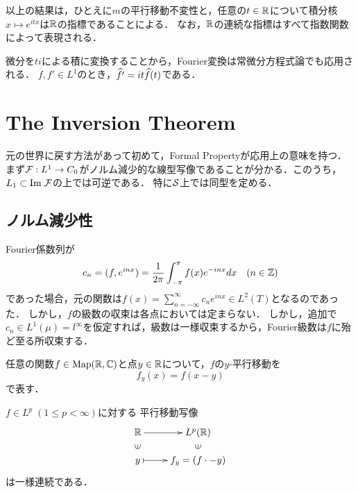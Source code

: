\documentclass[uplatex,dvipdfmx]{jsreport}
\begin{document}
\begin{remarks}
    以上の結果は，ひとえに$m$の平行移動不変性と，任意の$t\in\R$について積分核$x\mapsto e^{itx}$は$\R$の指標であることによる．
    なお，$\R$の連続な指標はすべて指数関数によって表現される．
\end{remarks}

\begin{remark}[(6)の逆]
    微分を$ti$による積に変換することから，Fourier変換は常微分方程式論でも応用される．
    $f,f'\in L^1$のとき，$\wh{f'}=it\wh{f}(t)$である．
\end{remark}

\section{The Inversion Theorem}

\begin{tcolorbox}[colframe=ForestGreen, colback=ForestGreen!10!white,breakable,colbacktitle=ForestGreen!40!white,coltitle=black,fonttitle=\bfseries\sffamily,
title=]
    元の世界に戻す方法があって初めて，Formal Propertyが応用上の意味を持つ．
    まず$\F:L^1\to C_0$がノルム減少的な線型写像であることが分かる．このうち，$L_1\subset\Im\F$の上では可逆である．
    特に$\S$上では同型を定める．
\end{tcolorbox}

\subsection{ノルム減少性}

\begin{discussion}[Fourier級数に関する逆転公式]
    Fourier係数列が
    \[c_n=(f,e^{inx})=\frac{1}{2\pi}\int^\pi_{-\pi}f(x)e^{-inx}dx\quad(n\in\Z)\]
    であった場合，元の関数は$f(x)=\sum^\infty_{n=-\infty}c_ne^{inx}\in L^2(T)$となるのであった．
    しかし，$f$の級数の収束は各点においては定まらない．
    しかし，追加で$c_n\in L^1(\mu)=l^\infty$を仮定すれば，級数は一様収束するから，Fourier級数は$f$に殆ど至る所収束する．
\end{discussion}

\begin{notation}
    任意の関数$f\in\Map(\R,\C)$と点$y\in\R$について，$f$の$y$-平行移動を
    \[f_y(x)=f(x-y)\]
    で表す．
\end{notation}

\begin{lemma}
    $f\in L^p\;(1\le p<\infty)$に対する
    平行移動写像
    \[\xymatrix@R-2pc{
        \R\ar[r]&L^p(\R)\\
        \rotatebox[origin=c]{90}{$\in$}&\rotatebox[origin=c]{90}{$\in$}\\
        y\ar@{|->}[r]&f_y=(f\cdot-y)
    }\]
    は一様連続である．
\end{lemma}
\end{document}
